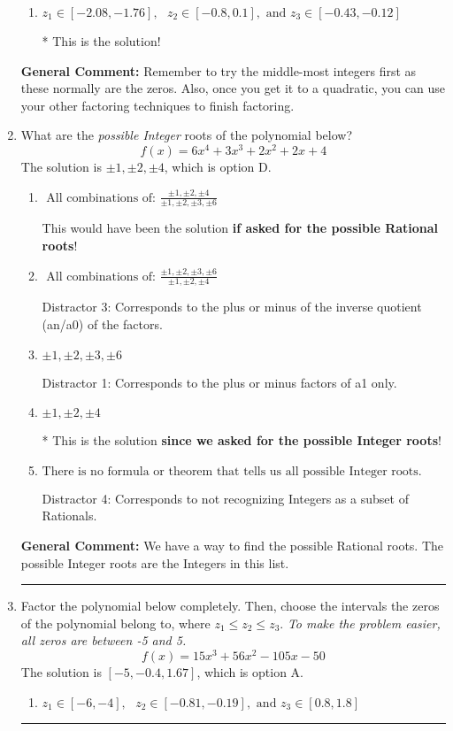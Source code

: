 \documentclass{extbook}[14pt]
\newcommand{\litem}[1]{\item #1

\rule{\textwidth}{0.4pt}}
\begin{document}
\begin{enumerate}
{\begin{enumerate}[label=\Alph*.]
 Distractor 1: Corresponds to negatives of all zeros.
\item \( z_1 \in [-2.08, -1.76], \text{   }  z_2 \in [-0.8, 0.1], \text{   and   } z_3 \in [-0.43, -0.12] \)

* This is the solution!
\end{enumerate}

\textbf{General Comment:} Remember to try the middle-most integers first as these normally are the zeros. Also, once you get it to a quadratic, you can use your other factoring techniques to finish factoring.
}
\litem{
What are the \textit{possible Integer} roots of the polynomial below?
\[ f(x) = 6x^{4} +3 x^{3} +2 x^{2} +2 x + 4 \]The solution is \( \pm 1,\pm 2,\pm 4 \), which is option D.\begin{enumerate}[label=\Alph*.]
\item \( \text{ All combinations of: }\frac{\pm 1,\pm 2,\pm 4}{\pm 1,\pm 2,\pm 3,\pm 6} \)

This would have been the solution \textbf{if asked for the possible Rational roots}!
\item \( \text{ All combinations of: }\frac{\pm 1,\pm 2,\pm 3,\pm 6}{\pm 1,\pm 2,\pm 4} \)

 Distractor 3: Corresponds to the plus or minus of the inverse quotient (an/a0) of the factors. 
\item \( \pm 1,\pm 2,\pm 3,\pm 6 \)

 Distractor 1: Corresponds to the plus or minus factors of a1 only.
\item \( \pm 1,\pm 2,\pm 4 \)

* This is the solution \textbf{since we asked for the possible Integer roots}!
\item \( \text{There is no formula or theorem that tells us all possible Integer roots.} \)

 Distractor 4: Corresponds to not recognizing Integers as a subset of Rationals.
\end{enumerate}

\textbf{General Comment:} We have a way to find the possible Rational roots. The possible Integer roots are the Integers in this list.
}
\litem{
Factor the polynomial below completely. Then, choose the intervals the zeros of the polynomial belong to, where $z_1 \leq z_2 \leq z_3$. \textit{To make the problem easier, all zeros are between -5 and 5.}
\[ f(x) = 15x^{3} +56 x^{2} -105 x -50 \]The solution is \( [-5, -0.4, 1.67] \), which is option A.\begin{enumerate}[label=\Alph*.]
\item \( z_1 \in [-6, -4], \text{   }  z_2 \in [-0.81, -0.19], \text{   and   } z_3 \in [0.8, 1.8] \)


\end{enumerate}}
\end{enumerate}
\end{document}
